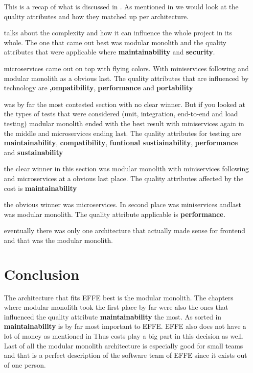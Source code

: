 This is a recap of what is discussed in . As mentioned in  we would look at the quality attributes and how they matched up per architecture.

 talks about the complexity and how it can influence the whole project in its whole. The one that came out best was modular monolith and the quality attributes that were applicable where \textbf{maintainability} and \textbf{security}.

 microservices came out on top with flying colors. With miniservices following and modular monolith as a obvious last. The quality attributes that are influenced by technology are \textbf{,ompatibility}, \textbf{performance} and \textbf{portability}

 was by far the most contested section with no clear winner. But if you looked at the types of tests that were considered (unit, integration, end-to-end and load testing) modular monolith ended with the best result with miniservices again in the middle and microservices ending last. The quality attributes for testing are \textbf{maintainability}, \textbf{compatibility}, \textbf{funtional sustiainability}, \textbf{performance} and \textbf{sustainability}

 the clear winner in this section was modular monolith with miniservices following and microservices at a obvious last place. The quality attributes affected by the cost is \textbf{maintainability}

 the obvious winner was microservices. In second place was miniservices andlast was modular monolith. The quality attribute applicable is \textbf{performance}.

 eventually there was only one architecture that actually made sense for frontend and that was the modular monolith.

\section{Conclusion}

The architecture that fits EFFE best is the modular monolith. The chapters where modular monolith took the first place by far were also the ones that influenced the quality attribute \textbf{maintainability} the most. As sorted in  \textbf{maintainability} is by far most important to EFFE. EFFE also does not have a lot of money as mentioned in  Thus costs play a big part in this decision as well. Last of all the modular monolith architecture is especially good for small teams and that is a perfect description of the software team of EFFE since it exists out of one person.

